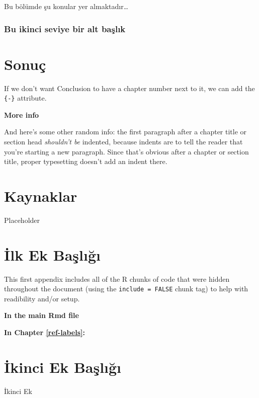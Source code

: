 \documentclass[12pt,twoside]{deuthesis}
\begin{document}
Bu bölümde şu konular yer almaktadır\ldots{}

\hypertarget{bu-ikinci-seviye-bir-alt-baux15flux131k-1}{%
\subsection{Bu ikinci seviye bir alt başlık}\label{bu-ikinci-seviye-bir-alt-baux15flux131k-1}}

\hypertarget{sonuuxe7}{%
\chapter*{Sonuç}\label{sonuuxe7}}

If we don't want Conclusion to have a chapter number next to it, we can add the \texttt{\{-\}} attribute.

\textbf{More info}

And here's some other random info: the first paragraph after a chapter title or section head \emph{shouldn't be} indented, because indents are to tell the reader that you're starting a new paragraph. Since that's obvious after a chapter or section title, proper typesetting doesn't add an indent there.

\hypertarget{kaynaklar}{%
\chapter*{Kaynaklar}\label{kaynaklar}}

Placeholder

\appendix

\hypertarget{ilk-ek-baux15flux131ux11fux131}{%
\chapter{İlk Ek Başlığı}\label{ilk-ek-baux15flux131ux11fux131}}

This first appendix includes all of the R chunks of code that were hidden throughout the document (using the \texttt{include\ =\ FALSE} chunk tag) to help with readibility and/or setup.

\textbf{In the main Rmd file}

\textbf{In Chapter \ref{ref-labels}:}

\hypertarget{ikinci-ek-baux15flux131ux11fux131}{%
\chapter{İkinci Ek Başlığı}\label{ikinci-ek-baux15flux131ux11fux131}}

İkinci Ek
\end{document}

